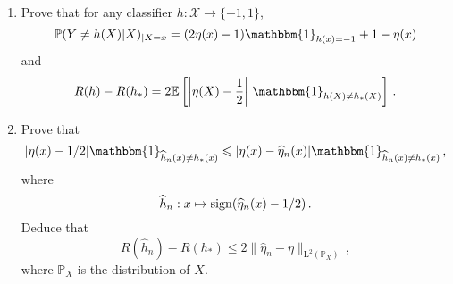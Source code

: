 \documentclass[a4paper,10pt,fleqn]{article}
\newcommand{\eqsp}{\,}
\newcommand{\bP}{\mathbb{P}}
\newcommand{\xset}{\ensuremath{\mathsf{X}}}
\newcommand{\1}{\ensuremath{\mathbbm{1}}}
\newcommand{\bE}{\mathbb{E}}
\begin{document}
\begin{enumerate}
\item Prove that for any classifier $h:\mathcal{X}\to \{-1,1\}$,
$$
\bP(Y\neq h(X)|X)_{|X=x} = (2\eta(x)-1)\1_{h(x)=-1}+1-\eta(x)
$$
and
$$
R(h)-R(h_{*})=2\bE \left[\left|\eta(X)-\frac{1}{2}\right|\eqsp\1_{h(X)\neq h_*(X)}\right]\eqsp.
$$
%
%
\item Prove that 
$$
|\eta(x)-1/2|\1_{\widehat h_n(x)\neq h_{*}(x)}\leqslant |\eta(x)-\widehat \eta_n(x)|\1_{\widehat h_n(x)\neq h_{*}(x)}\eqsp,
$$
where
$$
\widehat h_n:x \mapsto{\rm sign}(\widehat \eta_n(x)-1/2)\eqsp.
$$
Deduce that 
$$
R(\widehat h_n)-R(h_*)\leqslant 2\|\widehat \eta_n-\eta\|_{\mathrm{L}^2(\bP_X)}\eqsp,
$$
where $\bP_X$ is the distribution of $X$.
%

\end{enumerate}
\end{document}
